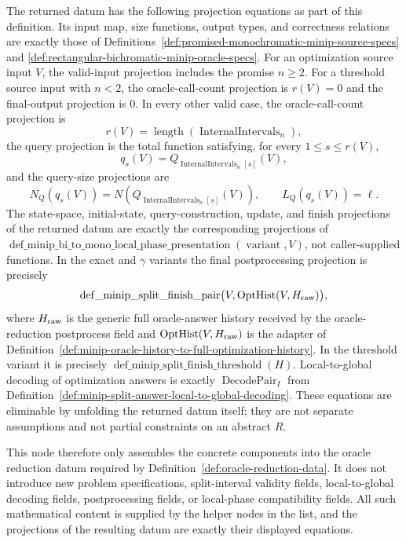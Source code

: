 \begin{definition}
  The returned datum has the following projection equations as part of this
  definition.  Its input map, size functions, output types, and correctness
  relations are exactly those of
  Definitions~\ref{def:promised-monochromatic-minip-source-specs} and
  \ref{def:rectangular-bichromatic-minip-oracle-specs}.  For an optimization
  source input $V$, the valid-input projection includes the promise $n\geq2$.
  For a threshold source input with $n<2$, the oracle-call-count projection is
  $r(V)=0$ and the final-output projection is $0$.  In every other valid case,
  the oracle-call-count projection is
  \[
    r(V)=\operatorname{length}(\operatorname{InternalIntervals}_n),
  \]
  the query projection is the total function satisfying, for every
  $1\leq s\leq r(V)$,
  \[
    q_s(V)=
      Q_{\operatorname{InternalIntervals}_n[s]}(V),
  \]
  and the query-size projections are
  \[
    N_Q(q_s(V))=
      N\!\left(Q_{\operatorname{InternalIntervals}_n[s]}(V)\right),
    \qquad
    L_Q(q_s(V))=\ell.
  \]
  The state-space, initial-state, query-construction, update, and finish
  projections of the returned datum are exactly the corresponding projections
  of
  $\operatorname{def\_minip\_bi\_to\_mono\_local\_phase\_presentation}
  (\operatorname{variant},V)$, not caller-supplied functions.  In the exact
  and $\gamma$ variants the final postprocessing projection is precisely
  \[
    \operatorname{def\_minip\_split\_finish\_pair}
      \bigl(V,\operatorname{OptHist}(V,H_{\rm raw})\bigr),
  \]
  where $H_{\rm raw}$ is the generic full oracle-answer history received by
  the oracle-reduction postprocess field and
  $\operatorname{OptHist}(V,H_{\rm raw})$ is the adapter of
  Definition~\ref{def:minip-oracle-history-to-full-optimization-history}.  In
  the threshold variant it is precisely
  $\operatorname{def\_minip\_split\_finish\_threshold}(H)$.  Local-to-global
  decoding of optimization answers is exactly
  $\operatorname{DecodePair}_I$ from
  Definition~\ref{def:minip-split-answer-local-to-global-decoding}.  These
  equations are eliminable by unfolding the returned datum itself; they are
  not separate assumptions and not partial constraints on an abstract $R$.

  This node therefore only assembles the concrete components into the oracle
  reduction datum required by Definition~\ref{def:oracle-reduction-data}.  It
  does not introduce new problem specifications, split-interval validity
  fields, local-to-global decoding fields, postprocessing fields, or
  local-phase compatibility fields.  All such mathematical content is supplied
  by the helper nodes in the \uses list, and the projections of the resulting
  datum are exactly their displayed equations.
\end{definition}


